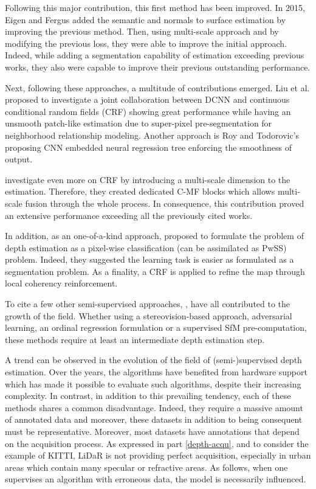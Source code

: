 Following this major contribution, this first method has been improved. In 2015, Eigen and Fergus \cite{eigen2015predicting} added the semantic and normals to surface estimation by improving the previous method. Then, using multi-scale approach and by modifying the previous loss, they were able to improve the initial approach. Indeed, while adding a segmentation capability of estimation exceeding previous works, they also were capable to improve their previous outstanding performance.

Next, following these approaches, a multitude of contributions emerged. Liu et al. \cite{liu2015deep} proposed to investigate a joint collaboration between DCNN and continuous conditional random fields (CRF) showing great performance while having an unsmooth patch-like estimation due to super-pixel pre-segmentation for neighborhood relationship modeling.
Another approach is Roy and Todorovic's \cite{roy2016monocular} proposing CNN embedded neural regression tree enforcing the smoothness of output. 
 
\cite{xu2017multi} investigate even more on CRF by introducing a multi-scale dimension to the estimation. Therefore, they created dedicated C-MF blocks which allows multi-scale fusion through the whole process. In consequence, this contribution proved an extensive performance exceeding all the previously cited works.

In addition, as an one-of-a-kind approach, \cite{cao2017estimating} proposed to formulate the problem of depth estimation as a pixel-wise classification (can be assimilated as PwSS) problem. Indeed, they suggested the learning task is easier as formulated as a segmentation problem. As a finality, a CRF is applied to refine the map through local coherency reinforcement.

To cite a few other semi-supervised approaches, \cite{guo2018learning,kundu2018adadepth,fu2018deep,klodt2018supervising}, have all contributed to the growth of the field. 
Whether using a stereovision-based approach, adversarial learning, an ordinal regression formulation or a supervised SfM pre-computation, these methods require at least an intermediate depth estimation step. 

A trend can be observed in the evolution of the field of (semi-)supervised depth estimation. Over the years, the algorithms have benefited from hardware support which has made it possible to evaluate such algorithms, despite their increasing complexity. In contrast, in addition to this prevailing tendency, each of these methods shares a common disadvantage. Indeed, they require a massive amount of annotated data and moreover, these datasets in addition to being consequent must be representative. 
Moreover, most datasets have annotations that depend on the acquisition process. As expressed in part \ref{depth-acqu}, and to consider the example of KITTI, LiDaR is not providing perfect acquisition, especially in urban areas which contain many specular or refractive areas. As follows, when one supervises an algorithm with erroneous data, the model is necessarily influenced.

